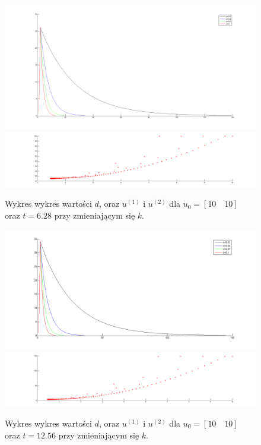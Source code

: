 \documentclass[a4paper,10pt]{article}
\begin{document}
\begin{figure}[!h]
    \centering
	\includegraphics[width=120mm]{CW4-alg1fun2-u10_10-k001_01-t628-d.png}
	\includegraphics[width=120mm]{CW4-alg1fun2-u10_10-k001_01-t628-u.png}
	\caption{Wykres wykres wartości $d$, oraz $u^{(1)}$ i $u^{(2)}$ dla $u_0=[10 \quad 10]$ oraz $t=6.28$ przy zmieniającym się $k$.}
    \label{fig:Rysunek}
\end{figure}
\begin{figure}[!h]
    \centering
	\includegraphics[width=120mm]{CW4-alg1fun2-u10_10-k001_01-t1256-d.png}
	\includegraphics[width=120mm]{CW4-alg1fun2-u10_10-k001_01-t1256-u.png}
	\caption{Wykres wykres wartości $d$, oraz $u^{(1)}$ i $u^{(2)}$ dla $u_0=[10 \quad 10]$ oraz $t=12.56$ przy zmieniającym się $k$.}
    \label{fig:Rysunek}
\end{figure}
\end{document}
